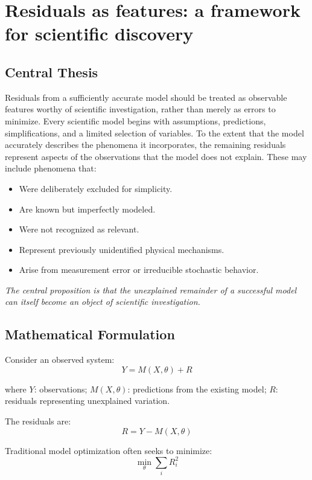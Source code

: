 \section{Residuals as features: a framework for scientific discovery}\label{sec:resfeat}
\subsection{Central Thesis}
Residuals from a sufficiently accurate model should be treated as observable features worthy of scientific investigation, rather than merely as errors to minimize.
Every scientific model begins with assumptions, predictions, simplifications, and a limited selection of variables.
To the extent that the model accurately describes the phenomena it incorporates, the remaining residuals represent aspects of the observations that the model does not explain.
These may include phenomena that:
\begin{itemize}\setlength\itemsep{0pt}
\item Were deliberately excluded for simplicity.
\item Are known but imperfectly modeled.
\item Were not recognized as relevant.
\item Represent previously unidentified physical mechanisms.
\item Arise from measurement error or irreducible stochastic behavior.
\end{itemize}
\emph{The central proposition is that the unexplained remainder of a successful model can itself become an object of scientific investigation.}

\subsection{Mathematical Formulation}
Consider an observed system: 
\begin{equation*}Y=M(X,\theta)+R\end{equation*}

where $Y$: observations; $M(X,\theta)$: predictions from the existing model; $R$: residuals representing unexplained variation.

The residuals are: 
\begin{equation*}\boxed{R=Y-M(X,\theta)}\end{equation*}

Traditional model optimization often seeks to minimize: 
\begin{equation*}\min_\theta \sum_i R_i^2\end{equation*}

